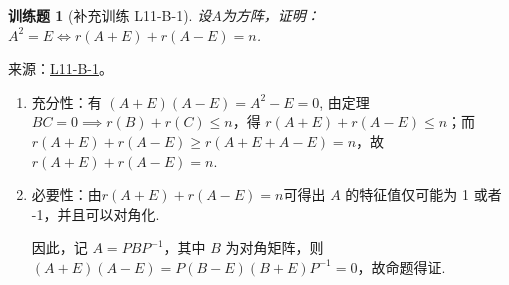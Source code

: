 \documentclass[UTF8,12pt,a4paper,fontset=fandol]{ctexart}
\newtheorem{exercise}{训练题}[section]
\begin{document}
\begin{exercise}[补充训练 L11-B-1]\label{prob:L11-B-1}
设$A$为方阵，证明：$A^2=E \iff r(A+E)+r(A-E)=n$.
\end{exercise}
\noindent 来源：\href{https://github.com/yhwu-is/Linear-Algebra-Left-Undone/blob/new/%E8%AE%B2%E4%B9%89/%E4%B8%93%E9%A2%98/11%20%E6%9C%9D%E8%8A%B1%E5%A4%95%E6%8B%BE.tex}{L11-B-1}。
\begin{solve}
\begin{enumerate}
            \item 充分性：有 $(A+E)(A-E) = A^2 - E = 0$, 由定理 $BC=0 \implies r(B)+r(C) \leqslant n$，得 $r(A+E)+r(A-E) \leqslant n$；而 $r(A+E)+r(A-E) \geqslant r(A+E+A-E) = n$，故 $r(A+E)+r(A-E)=n$.
            \item 必要性：由$r(A+E)+r(A-E)=n$可得出 $A$ 的特征值仅可能为 1 或者 -1，并且可以对角化.

                因此，记 $A = PBP^{-1}$，其中 $B$ 为对角矩阵，则 $(A+E)(A-E)=P(B-E)(B+E)P^{-1}=0$，故命题得证.
        \end{enumerate}
\end{solve}
\end{document}
